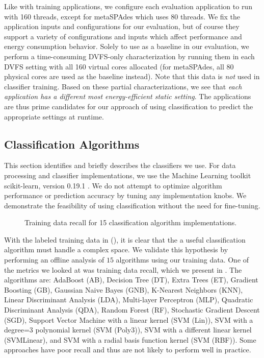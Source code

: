 Like with training applications, we configure each evaluation application to run with 160 threads, except for metaSPAdes which uses 80 threads.
We fix the application inputs and configurations for our evaluation, but of course they support a variety of configurations and inputs which affect performance and energy consumption behavior.
Solely to use as a baseline in our evaluation, we perform a time-consuming DVFS-only characterization by running them in each DVFS setting with all 160 virtual cores allocated (for metaSPAdes, all 80 physical cores are used as the baseline instead).
Note that this data is \emph{not} used in classifier training.
Based on these partial characterizations, we see that \emph{each application has a different most energy-efficient static setting}.
The applications are thus prime candidates for our approach of using classification to predict the appropriate settings at runtime.


\subsection{Classification Algorithms}

This section identifies and briefly describes the classifiers we use.
For data processing and classifier implementations, we use the Machine Learning toolkit scikit-learn, version 0.19.1 \cite{scikit-learn}.
We do not attempt to optimize algorithm performance or prediction accuracy by tuning any implementation knobs.
We demonstrate the feasibility of using classification without the need for fine-tuning.

\begin{figure}[t]
  \begin{centering}
    
    \caption{Training data recall for 15 classification algorithm implementations.}
    \label{fig:recall}
  \end{centering}
\end{figure}

With the labeled training data in  (), it is clear that the a useful classification algorithm must handle a complex space.
We validate this hypothesis by performing an offline analysis of $15$ algorithms using our training data.
One of the metrics we looked at was training data recall, which we present in .
The algorithms are: AdaBoost (AB), Decision Tree (DT), Extra Trees (ET), Gradient Boosting (GB), Gaussian Naive Bayes (GNB), K-Nearest Neighbors (KNN), Linear Discriminant Analysis (LDA), Multi-layer Perceptron (MLP), Quadratic Discriminant Analysis (QDA), Random Forest (RF), Stochastic Gradient Descent (SGD), Support Vector Machine with a linear kernel (SVM (Lin)), SVM with a degree=3 polynomial kernel (SVM (Poly3)), SVM with a different linear kernel (SVMLinear), and SVM with a radial basis function kernel (SVM (RBF)).
Some approaches have poor recall and thus are not likely to perform well in practice.


